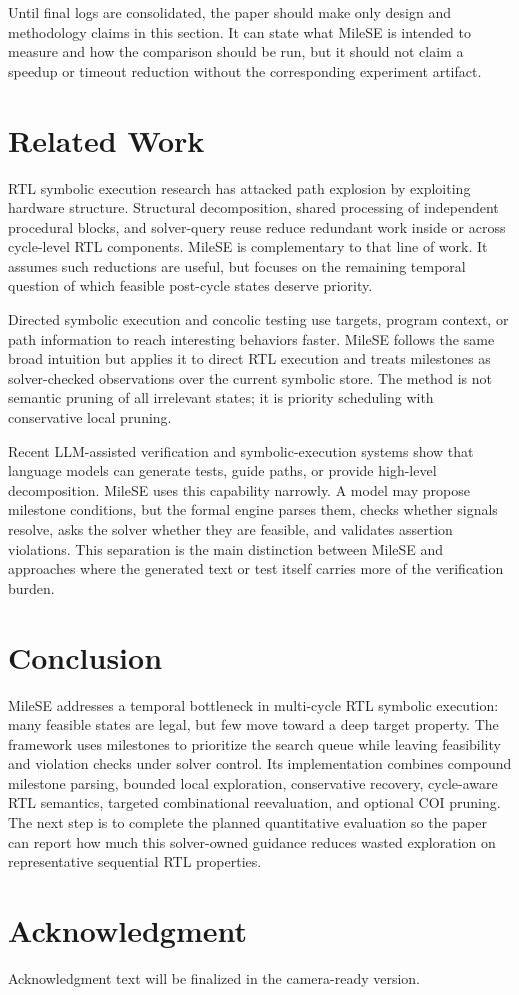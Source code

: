 \documentclass[conference]{IEEEtran}
\begin{document}
Until final logs are consolidated, the paper should make only design and methodology claims in this section. It can state what MileSE is intended to measure and how the comparison should be run, but it should not claim a speedup or timeout reduction without the corresponding experiment artifact.

\section{Related Work}
\label{sec:related}
RTL symbolic execution research has attacked path explosion by exploiting hardware structure. Structural decomposition, shared processing of independent procedural blocks, and solver-query reuse reduce redundant work inside or across cycle-level RTL components. MileSE is complementary to that line of work. It assumes such reductions are useful, but focuses on the remaining temporal question of which feasible post-cycle states deserve priority.

Directed symbolic execution and concolic testing use targets, program context, or path information to reach interesting behaviors faster. MileSE follows the same broad intuition but applies it to direct RTL execution and treats milestones as solver-checked observations over the current symbolic store. The method is not semantic pruning of all irrelevant states; it is priority scheduling with conservative local pruning.

Recent LLM-assisted verification and symbolic-execution systems show that language models can generate tests, guide paths, or provide high-level decomposition. MileSE uses this capability narrowly. A model may propose milestone conditions, but the formal engine parses them, checks whether signals resolve, asks the solver whether they are feasible, and validates assertion violations. This separation is the main distinction between MileSE and approaches where the generated text or test itself carries more of the verification burden.

\section{Conclusion}
\label{sec:conclusion}
MileSE addresses a temporal bottleneck in multi-cycle RTL symbolic execution: many feasible states are legal, but few move toward a deep target property. The framework uses milestones to prioritize the search queue while leaving feasibility and violation checks under solver control. Its implementation combines compound milestone parsing, bounded local exploration, conservative recovery, cycle-aware RTL semantics, targeted combinational reevaluation, and optional COI pruning. The next step is to complete the planned quantitative evaluation so the paper can report how much this solver-owned guidance reduces wasted exploration on representative sequential RTL properties.

\section*{Acknowledgment}
Acknowledgment text will be finalized in the camera-ready version.
\end{document}
